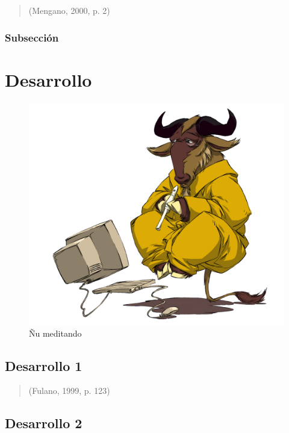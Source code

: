 \documentclass[12pt,c5paper,oneside]{book} %
\begin{document}
\lipsum[1-3]

\begin{quote}
	\lipsum[1] (Mengano, 2000, p. 2)
\end{quote}

\subsection{Subsección}

\lipsum[4-6]

\clearpage{\pagestyle{empty}\cleardoublepage}

\chapter{Desarrollo}


\lipsum[1-4]

\begin{figure}[ht!]
	\label{img1}
	\caption{Ñu meditando}
	\centering	\includegraphics[width=.8\textwidth]{linuximagen}
\end{figure}

\section{Desarrollo 1}

\lipsum[1-2]

\begin{quotation}
	\lipsum[1-2] (Fulano, 1999, p. 123)
\end{quotation}

\section{Desarrollo 2}
\end{document}

